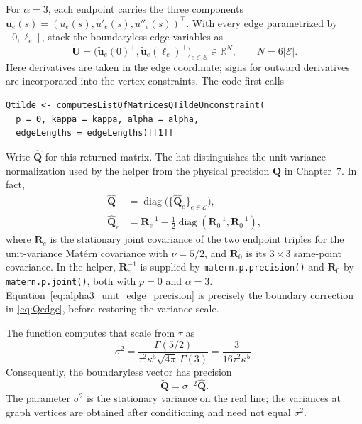 \documentclass[11pt,a4paper]{article}
\theoremstyle{plain}
\theoremstyle{definition}
\begin{document}
For $\alpha=3$, each endpoint carries the three components
$\boldsymbol{u}_e(s)=(u_e(s),u'_e(s),u''_e(s))^\top$. With every edge
parametrized by $[0,\ell_e]$, stack the boundaryless edge variables as
\begin{equation}
\widetilde{\mathbf U}
=\big(\widetilde{\boldsymbol{u}}_e(0)^\top,
       \widetilde{\boldsymbol{u}}_e(\ell_e)^\top\big)_{e\in\mathcal E}^\top
\in\mathbb R^N,\qquad N=6|\mathcal E|.
\end{equation}
Here derivatives are taken in the edge coordinate; signs for outward
derivatives are incorporated into the vertex constraints.
The code first calls
\begin{verbatim}
Qtilde <- computesListOfMatricesQTildeUnconstraint(
  p = 0, kappa = kappa, alpha = alpha,
  edgeLengths = edgeLengths)[[1]]
\end{verbatim}
Write $\widehat{\mathbf Q}$ for this returned matrix. The hat distinguishes
the unit-variance normalization used by the helper from the physical
precision $\widetilde{\mathbf Q}$ in Chapter~7. In fact,
\begin{align}
\widehat{\mathbf Q}
&=\operatorname{diag}\big(\{\widehat{\mathbf Q}_e\}_{e\in\mathcal E}\big),\\
\widehat{\mathbf Q}_e
&=\mathbf R_e^{-1}
 -\frac12\operatorname{diag}(\mathbf R_0^{-1},\mathbf R_0^{-1}),
\label{eq:alpha3_unit_edge_precision}
\end{align}
where $\mathbf R_e$ is the stationary joint covariance of the two endpoint
triples for the unit-variance Mat\'ern covariance with $\nu=5/2$, and
$\mathbf R_0$ is its $3\times3$ same-point covariance. In the helper,
$\mathbf R_e^{-1}$ is supplied by \texttt{matern.p.precision()} and
$\mathbf R_0$ by \texttt{matern.p.joint()}, both with $p=0$ and
$\alpha=3$. Equation~\eqref{eq:alpha3_unit_edge_precision} is precisely
the boundary correction in \eqref{eq:Qedge}, before restoring the
variance scale.

The function computes that scale from $\tau$ as
\begin{equation}
\sigma^2
=\frac{\Gamma(5/2)}{\tau^2\kappa^5\sqrt{4\pi}\,\Gamma(3)}
=\frac{3}{16\tau^2\kappa^5}.
\label{eq:alpha3_sigma_scale}
\end{equation}
Consequently, the boundaryless vector has precision
\begin{equation}
\widetilde{\mathbf Q}=\sigma^{-2}\widehat{\mathbf Q}.
\label{eq:alpha3_physical_precision}
\end{equation}
The parameter $\sigma^2$ is the stationary variance on the real line;
the variances at graph vertices are obtained after conditioning and
need not equal $\sigma^2$.
\end{document}
